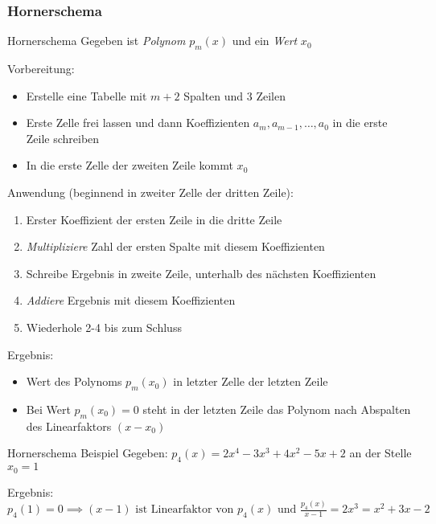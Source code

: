 \documentclass[german]{spicker}
\begin{document}
\subsubsection{Hornerschema}
\begin{algo}{Hornerschema}
    Gegeben ist \emph{Polynom} $p_m(x)$ und ein \emph{Wert} $x_0$

    Vorbereitung:
    \begin{itemize}
        \item Erstelle eine Tabelle mit $m + 2$ Spalten und 3 Zeilen
        \item Erste Zelle frei lassen und dann Koeffizienten $a_m, a_{m-1}, \ldots, a_0$ in die erste Zeile schreiben
        \item In die erste Zelle der zweiten Zeile kommt $x_0$
    \end{itemize}

    Anwendung (beginnend in zweiter Zelle der dritten Zeile):
    \begin{enumerate}
        \item Erster Koeffizient der ersten Zeile in die dritte Zeile
        \item \emph{Multipliziere} Zahl der ersten Spalte mit diesem Koeffizienten
        \item Schreibe Ergebnis in zweite Zeile, unterhalb des nächsten Koeffizienten
        \item \emph{Addiere} Ergebnis mit diesem Koeffizienten
        \item Wiederhole 2-4 bis zum Schluss
    \end{enumerate}

    Ergebnis:
    \begin{itemize}
        \item Wert des Polynoms $p_m(x_0)$ in letzter Zelle der letzten Zeile
        \item Bei Wert $p_m(x_0) = 0$ steht in der letzten Zeile das Polynom nach Abspalten des Linearfaktors $(x-x_0)$
    \end{itemize}
\end{algo}

\begin{bonus}{Hornerschema Beispiel}
    Gegeben: $p_4(x) = 2x^4-3x^3+4x^2-5x+2$ an der Stelle $x_0 = 1$


    Ergebnis: $p_4(1) = 0 \implies (x-1) \text{ ist Linearfaktor von } p_4(x) \text{ und } \frac{p_4(x)}{x-1} = 2x^3 = x^2 + 3x -2$
\end{bonus}
\end{document}
